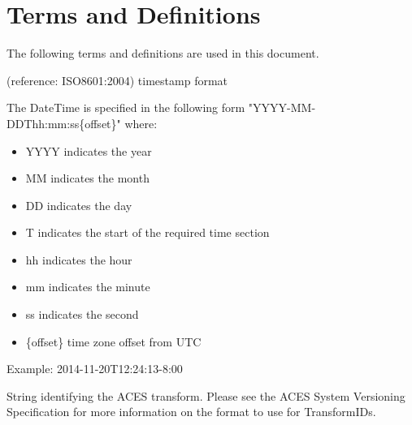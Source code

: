 \numberedformat
\chapter{Terms and Definitions}
The following terms and definitions are used in this document.

(reference: ISO8601:2004) timestamp format  

The DateTime is specified in the following form "YYYY-MM-DDThh:mm:ss\{offset\}" where:
\begin{itemize}
    \item YYYY indicates the year
    \item MM indicates the month
    \item DD indicates the day
    \item T indicates the start of the required time section
    \item hh indicates the hour
    \item mm indicates the minute
    \item ss indicates the second
    \item \{offset\} time zone offset from UTC
\end{itemize}

Example:  2014-11-20T12:24:13-8:00

String identifying the ACES transform. Please see the ACES System Versioning Specification for more information on the format to use for TransformIDs.